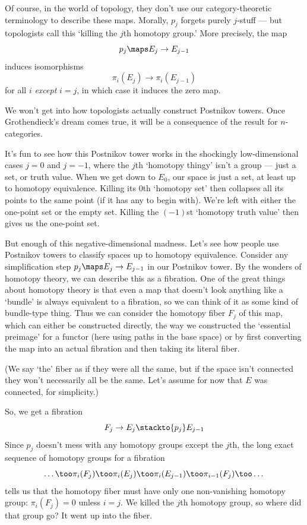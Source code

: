 \documentclass{amsart}
\begin{document}
Of course, in the world of topology, they don't use our category-theoretic 
terminology to describe these maps.  Morally, $p_j$
forgets purely $j$-stuff --- but topologists call this `killing the
$j$th homotopy group.'  More precisely, the map
\[p_j \maps E_j \to E_{j-1}\]
induces isomorphisms
\[\pi_i(E_j)\to \pi_i(E_{j-1})\]
for all $i$ \emph{except} $i=j$, in which case it induces the zero map.

We won't get into how topologists actually
construct Postnikov towers.  Once Grothendieck's dream
comes true, it will be a consequence of the result for 
$n$-categories.

It's fun to see how this Postnikov tower works in the shockingly 
low-dimensional cases $j = 0$ and $j = -1$, where the $j$th 
`homotopy thingy' isn't a group --- just a set, or truth value.  
When we get down to $E_0$, our space is just a set, at least
up to homotopy equivalence.  Killing its $0$th `homotopy set' then 
collapses all its points to the same point (if it has any to begin with).  
We're left with either the one-point set or the empty set.
Killing the $(-1)$st `homotopy truth value' then gives us the
one-point set.

But enough of this negative-dimensional madness.  Let's see how
people use Postnikov towers to classify spaces up to homotopy
equivalence.  Consider any simplification step $p_j\maps E_j\to E_{j-1}$ 
in our Postnikov tower.  By
the wonders of homotopy theory, we can describe this as a fibration.
One of the great things about homotopy theory is that even a map
that doesn't look anything like a `bundle' is always 
equivalent to a fibration, so we can think of it as some kind of
bundle-type thing.  Thus we can consider the homotopy fiber
$F_j$ of this map, which can either be constructed directly, the way
we constructed the `essential preimage' for a functor (here using
paths in the base space) or by first converting the map into an actual
fibration and then taking its literal fiber.

(We say `the' fiber as if they were all the same, but if the space
isn't connected they won't necessarily all be the same.  Let's assume
for now that $E$ was connected, for simplicity.)

So, we get a fibration
\[            F_j \to E_j \stackto{p_j} E_{j-1}  \]
Since $p_j$ doesn't mess with any homotopy groups except the $j$th,
the long exact sequence of homotopy groups for a fibration
\[ \dots\too \pi_i(F_j) \too \pi_i(E_j) \too \pi_i(E_{j-1}) 
\too \pi_{i-1}(F_j)\too\dots\]
tells us that the homotopy fiber must have only one non-vanishing
homotopy group: $\pi_i(F_j)=0$ unless $i=j$.  We killed the $j$th
homotopy group, so where did that group go?  It went up into the fiber.
\end{document}

